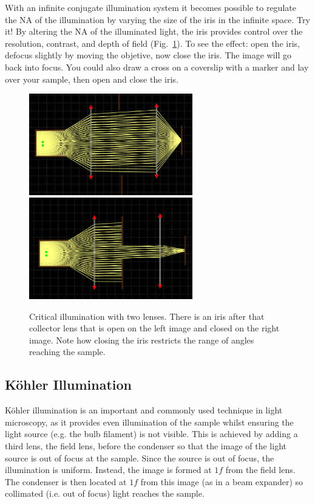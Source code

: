 \documentclass[a4paper]{report}
\begin{document}
With an infinite conjugate illumination system it becomes possible to regulate the NA of the illumination by varying the size of the iris in the infinite space. 
Try it!
By altering the NA of the illuminated light, the iris provides control over the resolution, contrast, and depth of field (Fig.~\ref{fig:critical_iris}).
To see the effect: open the iris, defocus slightly by moving the objetive, now close the iris. The image will go back into focus. 
You could also draw a cross on a coverslip with a marker and lay over your sample, then open and close the iris.

\begin{figure}[h]
\center
\includegraphics[width=2.8in]{critical_open_iris.eps}
\includegraphics[width=2.8in]{critical_closed_iris.eps}
\caption{Critical illumination with two lenses. 
There is an iris after that collector lens that is open on the left image and closed on the right image. 
Note how closing the iris restricts the range of angles reaching the sample.}
\label{fig:critical_iris}
\end{figure}



\clearpage

\subsection{K\"{o}hler Illumination}
K\"{o}hler illumination is an important and commonly used technique in light microscopy, as it provides even illumination of the sample whilst ensuring the light source (e.g. the bulb filament) is not visible. 
This is achieved by adding a third lens, the field lens, before the condenser so that the image of the light source is out of focus at the sample. 
Since the source is out of focus, the illumination is uniform. 
Instead, the image is formed at $1f$ from the field lens. 
The condenser is then located at $1f$ from this image (as in a beam expander) so collimated (i.e. out of focus) light reaches the sample. 
\end{document}
